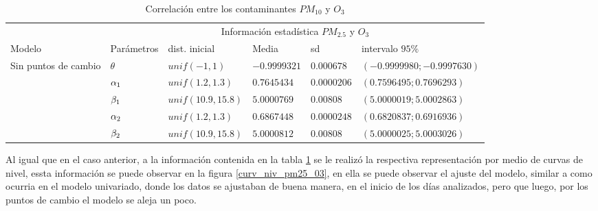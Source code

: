 \begin{table}[!h]
\centering
\begin{tabular}{|l|l|l|l|l|l|}
\hline
& \multicolumn{5}{c|}{Información estadística $PM_{2.5}$ y $O_3$} \\
\cline{2-6}
Modelo & Parámetros & dist. inicial  & Media & sd  &   intervalo $95 \%$\\
\hline \hline
\multirow{5}{1.5cm}{Sin puntos de cambio } & $\theta$ & $unif(-1,1)$ & $-0.9999321$ & $0.000678$ & $(-0.9999980 ;-0.9997630 )$ \\ \cline{2-6}
& $\alpha_1$& $unif(1.2,1.3)$ & $0.7645434$ & $0.0000206$ & $( 0.7596495;0.7696293)$\\  \cline{2-6}
& $\beta_1$& $unif(10.9,15.8)$ & $5.0000769$ & $0.00808$ & $(5.0000019;5.0002863)$\\  \cline{2-6}
& $\alpha_2$& $unif(1.2,1.3)$ & $0.6867448$ & $0.0000248$ & $(0.6820837;0.6916936)$\\  \cline{2-6}
& $\beta_2$& $unif(10.9,15.8)$ & $5.0000812$ & $0.00808$ & $(5.0000025;5.0003026)$\\  \cline{1-6}

\end{tabular}
\caption{Correlación entre los contaminantes $PM_{10}$ y $O_3$  }
\label{infoestad_PM2.5_Oz}
\end{table}
\newpage

Al igual que en el caso anterior, a la información contenida en la tabla \ref{infoestad_PM2.5_Oz} se le realizó la respectiva representación por medio de curvas de nivel, essta información se puede observar en la figura \ref{curv_niv_pm25_03}, en ella se puede observar el ajuste del modelo, similar a como ocurria en el modelo univariado, donde los datos se ajustaban de buena manera, en el inicio de los días analizados, pero que luego, por los puntos de cambio el modelo se aleja un poco.


